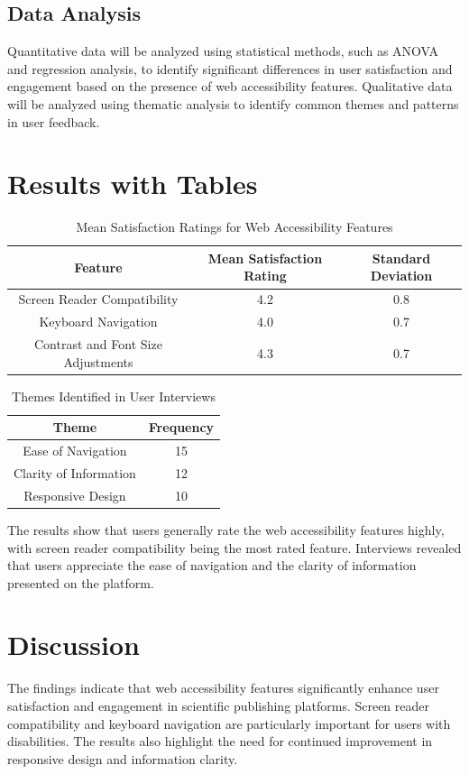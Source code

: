 \documentclass{article}
\begin{document}
\subsection{Data Analysis}
Quantitative data will be analyzed using statistical methods, such as ANOVA and regression analysis, to identify significant differences in user satisfaction and engagement based on the presence of web accessibility features. Qualitative data will be analyzed using thematic analysis to identify common themes and patterns in user feedback.

\section{Results with Tables}
\begin{table}[htbp]
\centering
\begin{tabular}{|c|c|c|}
\hline
\textbf{Feature} & \textbf{Mean Satisfaction Rating} & \textbf{Standard Deviation} \\
\hline
Screen Reader Compatibility & 4.2 & 0.8 \\
\hline
Keyboard Navigation & 4.0 & 0.7 \\
\hline
Contrast and Font Size Adjustments & 4.3 & 0.7 \\
\hline
\end{tabular}
\caption{Mean Satisfaction Ratings for Web Accessibility Features}
\label{tab:satisfactionratings}
\end{table}

\begin{table}[htbp]
\centering
\begin{tabular}{|c|c|}
\hline
\textbf{Theme} & \textbf{Frequency} \\
\hline
Ease of Navigation & 15 \\
\hline
Clarity of Information & 12 \\
\hline
Responsive Design & 10 \\
\hline
\end{tabular}
\caption{Themes Identified in User Interviews}
\label{tab:interviewthemes}
\end{table}

The results show that users generally rate the web accessibility features highly, with screen reader compatibility being the most rated feature. Interviews revealed that users appreciate the ease of navigation and the clarity of information presented on the platform.

\section{Discussion}
The findings indicate that web accessibility features significantly enhance user satisfaction and engagement in scientific publishing platforms. Screen reader compatibility and keyboard navigation are particularly important for users with disabilities. The results also highlight the need for continued improvement in responsive design and information clarity.
\end{document}
